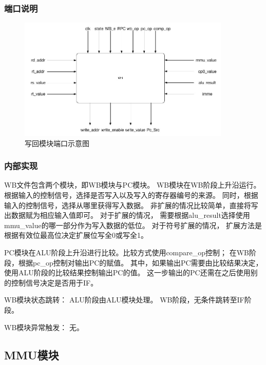         \subsubsection{端口说明}
            
            \begin{figure}[!hbp]
                \centering
                \caption{写回模块端口示意图}
                \includegraphics[width=0.9\textwidth]{chart/wb.jpg}
            \end{figure}
        \subsubsection{内部实现}
            WB文件包含两个模块，即WB模块与PC模块。%
            WB模块在WB阶段上升沿运行。%
            根据输入的控制信号，选择是否写入以及写入的寄存器编号的来源。%
            同时，根据输入的控制信号，选择从哪里获得写入数据。%
            非扩展的情况比较简单，直接将写出数据赋为相应输入值即可。%
            对于扩展的情况，%
            需要根据alu\_result选择使用mmu\_value的哪一部分作为写入数据的低位。
            对于符号扩展的情况，%
            扩展方法是根据有效位最高位决定扩展位写全0或写全1。
            
            PC模块在ALU阶段上升沿进行比较。比较方式使用compare\_op控制；%
            在WB阶段，根据pc\_op控制对输出PC的赋值。%
            其中，如果输出PC需要由比较结果决定，%
            使用ALU阶段的比较结果控制输出PC的值。%
            这一步输出的PC还需在之后使用别的控制信号决定是否用于IF。

            WB模块状态跳转：%
	        ALU阶段由ALU模块处理。%
	        WB阶段，无条件跳转至IF阶段。

            WB模块异常触发：%
	        无。

    \subsection{MMU模块}

